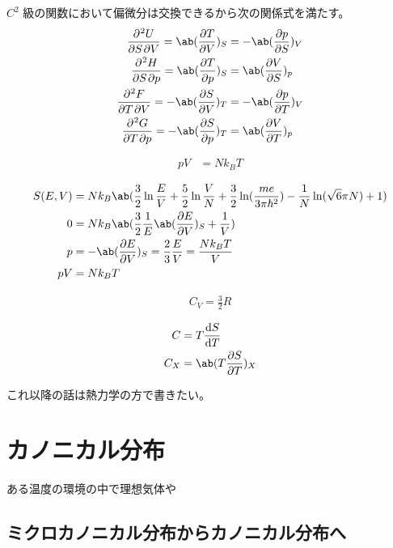 \documentclass[a4paper,11pt]{jlreq}
\begin{document}
\begin{theorem}
  $C^2$ 級の関数において偏微分は交換できるから次の関係式を満たす。
  \begin{align}
    \diffp{U}{S,V} = \ab(\diffp{T}{V})_S  & = -\ab(\diffp{p}{S})_V \\
    \diffp{H}{S,p} = \ab(\diffp{T}{p})_S  & = \ab(\diffp{V}{S})_p  \\
    \diffp{F}{T,V} = -\ab(\diffp{S}{V})_T & = -\ab(\diffp{p}{T})_V \\
    \diffp{G}{T,p} = -\ab(\diffp{S}{p})_T & = \ab(\diffp{V}{T})_p
  \end{align}
\end{theorem}

\begin{theorem}[理想気体の状態方程式]
  \begin{align}
    pV & = Nk_BT
  \end{align}
\end{theorem}
\begin{align}
  S(E, V) & = Nk_B\ab(\frac{3}{2}\ln\frac{E}{V} + \frac{5}{2}\ln\frac{V}{N} + \frac{3}{2}\ln(\frac{me}{3\pi\hbar^2}) - \frac{1}{N}\ln(\sqrt{6}\pi N) + 1) \\
  0       & = Nk_B\ab(\frac{3}{2}\frac{1}{E}\ab(\diffp{E}{V})_S + \frac{1}{V})                                                                            \\
  p       & = -\ab(\diffp{E}{V})_S = \frac{2}{3}\frac{E}{V} = \frac{Nk_BT}{V}                                                                             \\
  pV      & = Nk_BT
\end{align}

\begin{align}
  C_V = \frac{3}{2}R
\end{align}

\begin{definition}[比熱]
  \begin{align}
    C   & = T\diff{S}{T}         \\
    C_X & = \ab(T\diffp{S}{T})_X
  \end{align}
\end{definition}
これ以降の話は熱力学の方で書きたい。

\section{カノニカル分布}
ある温度の環境の中で理想気体や
\subsection{ミクロカノニカル分布からカノニカル分布へ}
\end{document}
